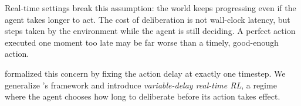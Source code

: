 \documentclass{article}
\begin{document}
Real-time settings break this assumption: the world keeps progressing
even if the agent takes longer to act.
The cost of deliberation is not wall-clock latency, but steps taken by
the environment while the agent is still deciding.
A perfect action executed one moment too late may be far worse than a
timely, good-enough action.

\citet{ramstedt2019rtrl} formalized this concern by fixing the action
delay at exactly one timestep.
We generalize \citet{ramstedt2019rtrl}'s framework and introduce
\emph{variable-delay real-time RL}, a regime where the agent chooses how long to deliberate before its action takes
effect.







\end{document}
